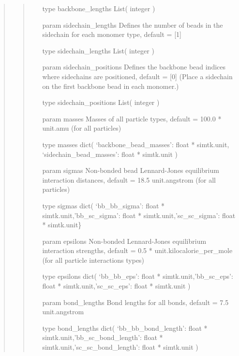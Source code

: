 \documentclass[letterpaper,12pt,english,openany,oneside]{sphinxmanual}
\begin{document}
\begin{fulllineitems}
\begin{quote}
\begin{quote}
\begin{description}
\begin{itemize}
\begin{itemize}
\item[{type backbone\_lengths}] \leavevmode
List( integer )

\item[{param sidechain\_lengths}] \leavevmode
Defines the number of beads in the sidechain for each monomer type, default = {[}1{]}

\item[{type sidechain\_lengths}] \leavevmode
List( integer )

\item[{param sidechain\_positions}] \leavevmode
Defines the backbone bead indices where sidechains are positioned, 
default = {[}0{]} (Place a sidechain on the first backbone bead in each monomer.)

\item[{type sidechain\_positions}] \leavevmode
List( integer )

\item[{param masses}] \leavevmode
Masses of all particle types, default = 100.0 * unit.amu (for all particles)

\item[{type masses}] \leavevmode
dict( ‘backbone\_bead\_masses’: float * simtk.unit, ‘sidechain\_bead\_masses’: float * simtk.unit )

\item[{param sigmas}] \leavevmode
Non-bonded bead Lennard-Jones equilibrium interaction distances, default = 18.5 unit.angstrom (for all particles)

\item[{type sigmas}] \leavevmode
dict( ‘bb\_bb\_sigma’: float * simtk.unit,’bb\_sc\_sigma’: float * simtk.unit,’sc\_sc\_sigma’: float * simtk.unit\}

\item[{param epsilons}] \leavevmode
Non-bonded Lennard-Jones equilibrium interaction strengths, default = 0.5 * unit.kilocalorie\_per\_mole (for all particle interactions types)

\item[{type epsilons}] \leavevmode
dict( ‘bb\_bb\_eps’: float * simtk.unit,’bb\_sc\_eps’: float * simtk.unit,’sc\_sc\_eps’: float * simtk.unit )

\item[{param bond\_lengths}] \leavevmode
Bond lengths for all bonds, default = 7.5 unit.angstrom

\item[{type bond\_lengths}] \leavevmode
dict( ‘bb\_bb\_bond\_length’: float * simtk.unit,’bb\_sc\_bond\_length’: float * simtk.unit,’sc\_sc\_bond\_length’: float * simtk.unit )


\end{itemize}
\end{itemize}
\end{description}
\end{quote}
\end{quote}
\end{fulllineitems}
\end{document}
